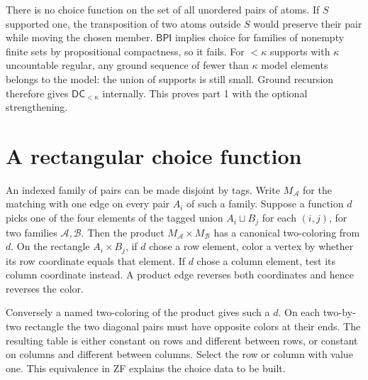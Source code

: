 \documentclass[11pt]{article}
\newcommand{\BPI}{\mathsf{BPI}}
\newcommand{\DC}{\mathsf{DC}}
\begin{document}
There is no choice function on the set of all unordered pairs of atoms. If $S$ supported one, the transposition of two atoms outside $S$ would preserve their pair while moving the chosen member. $\BPI$ implies choice for families of nonempty finite sets by propositional compactness, so it fails. For $<\kappa$ supports with $\kappa$ uncountable regular, any ground sequence of fewer than $\kappa$ model elements belongs to the model: the union of supports is still small. Ground recursion therefore gives $\DC_{<\kappa}$ internally. This proves part 1 with the optional strengthening.

\section{A rectangular choice function}
An indexed family of pairs can be made disjoint by tags. Write $M_{\mathcal A}$ for the matching with one edge on every pair $A_i$ of such a family. Suppose a function $d$ picks one of the four elements of the tagged union $A_i\sqcup B_j$ for each $(i,j)$, for two families $\mathcal A,\mathcal B$. Then the product $M_{\mathcal A}\times M_{\mathcal B}$ has a canonical two-coloring from $d$. On the rectangle $A_i\times B_j$, if $d$ chose a row element, color a vertex by whether its row coordinate equals that element. If $d$ chose a column element, test its column coordinate instead. A product edge reverses both coordinates and hence reverses the color.

Conversely a named two-coloring of the product gives such a $d$. On each two-by-two rectangle the two diagonal pairs must have opposite colors at their ends. The resulting table is either constant on rows and different between rows, or constant on columns and different between columns. Select the row or column with value one. This equivalence in ZF explains the choice data to be built.
\end{document}
